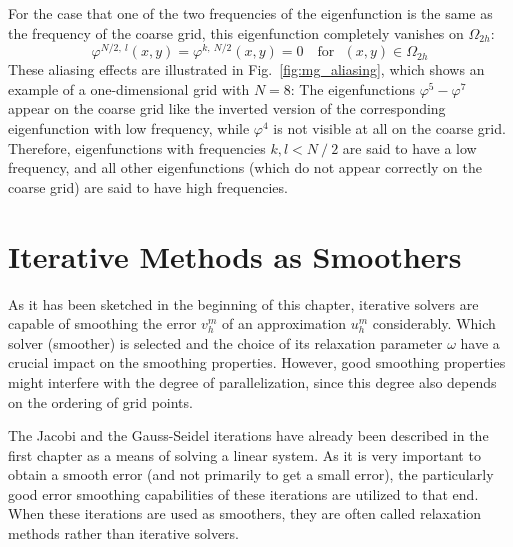 For the case that one of the two frequencies of the eigenfunction is the same as the frequency of the coarse grid, this eigenfunction completely vanishes on $\Omega_{2h}$:
\begin{equation}
\varphi^{N/2,~l}(x,y) = \varphi^{k,~N/2}(x,y) = 0  \text{~~~for~~}  (x,y) \in \Omega_{2h} 
\end{equation}
These aliasing effects are illustrated in Fig.~\ref{fig:mg_aliasing}, which shows an example of a one-dimensional grid with $N = 8$:  The eigenfunctions $\varphi^5-\varphi^7$ appear on the coarse grid like the inverted version of the corresponding eigenfunction with low frequency, while $\varphi^4$ is not visible at all on the coarse grid.
Therefore, eigenfunctions with frequencies $k, l < N~/~2$ are said to have a low frequency, and all other eigenfunctions (which do not appear correctly on the coarse grid) are said to have high frequencies.





\section{Iterative Methods as Smoothers}
As it has been sketched in the beginning of this chapter, iterative solvers are capable of smoothing the error $v_h^m$ of an approximation $u_h^m$ considerably. Which solver (smoother) is selected and the choice of its relaxation parameter $\omega$ have a crucial impact on the smoothing properties. However, good smoothing properties might interfere with the degree of parallelization, since this degree also depends on the ordering of grid points.

The Jacobi and the Gauss-Seidel iterations have already been described in the first chapter as a means of solving a linear system. As it is very important to obtain a smooth error (and not primarily to get a small error), the particularly good error smoothing capabilities of these iterations are utilized to that end. When these iterations are used as smoothers, they are often called relaxation methods rather than iterative solvers. 


